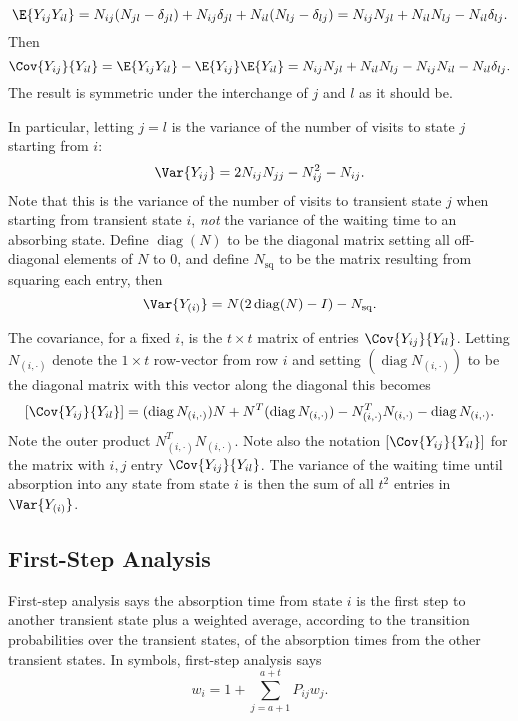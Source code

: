 \documentclass[12pt]{article}
\begin{document}
\[
    \E{Y_{ij} Y_{il}} = N_{ij}(N_{jl}-\delta_{jl}) + N_{ij} \delta_{jl}
    + N_{il}(N_{lj}-\delta_{lj}) = N_{ij}N_{jl} + N_{il}N_{lj} - N_{il}\delta_
    {lj}.
\] Then
\begin{equation}
    \Cov{Y_{ij}}{Y_{il}} = \E{Y_{ij} Y_{il}} - \E{Y_{ij}} \E{Y_{il}} = N_
    {ij}N_{jl} + N_{il}N_{lj} - N_{ij}N_{il} - N_{il}\delta_{lj}.%
    \label{eq:newwaitingtime:cov}
\end{equation}
The result is symmetric under the interchange of \( j \) and \( l \) as
it should be.

In particular, letting \( j=l \) is the variance of the number of visits
to state \( j \) starting from \( i \):
\[
    \Var{Y_{ij}} = 2 N_{ij}N_{jj} - N_{ij}^2 - N_{ij}.
\] Note that this is the variance of the number of visits to transient
state \( j \) when starting from transient state \( i \), \emph{not} the
variance of the waiting time to an absorbing state.  Define \(
\operatorname{diag}
(N) \) to be the diagonal matrix setting all off-diagonal elements of \(
N \) to \( 0 \), and define \( N_{\text{sq}} \) to be the matrix
resulting from squaring each entry, then
\[
    \Var{Y_{(i)}} = N(2
    \operatorname{diag}
    (N) - I) - N_{\text{sq}}.
\]

The covariance, for a fixed \( i \), is the \( t \times t \) matrix of
entries \( \Cov{Y_{ij}}{ Y_{il}} \).  Letting \( N_{(i,\cdot)} \) denote
the \( 1 \times t \) row-vector from row \( i \) and setting \( (
\operatorname{diag}
N_{(i,\cdot)}) \) to be the diagonal matrix with this vector along the
diagonal this becomes
\[
    \left[ \Cov{Y_{ij}}{Y_{il}} \right] = (
    \operatorname{diag}
    {N_{(i,\cdot)}}) N + N^T (
    \operatorname{diag}
    {N_{(i,\cdot)}}) - N_{(i,\cdot)}^T N_{(i,\cdot)} -
    \operatorname{diag}
    N_{(i,\cdot)}.
\] Note the outer product \( N_{(i,\cdot)}^T N_{(i,\cdot)} \).  Note
also the notation \( \left[ \Cov{Y_{ij}}{Y_{il}}\right] \) for the
matrix with \( i,j \) entry \( \Cov{Y_{ij}}{Y_{il}} \).  The variance of
the waiting time until absorption into any state from state \( i \) is
then the sum of all \( t^2 \) entries in \( \Var{Y_{(i)}} \).

\subsection*{First-Step Analysis}

First-step analysis%
says the absorption time from state \( i \) is the first step to another
transient state plus a weighted average, according to the transition
probabilities over the transient states, of the absorption times from
the other transient states.  In symbols, first-step analysis says
\[
    w_i = 1 + \sum\limits_{j=a+1}^{a+t} P_{ij} w_j.
\]
\end{document}
